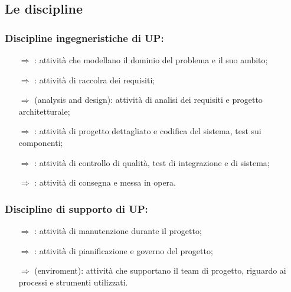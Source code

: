 \subsection{Le discipline}



\subsubsection{Discipline ingegneristiche di UP:}

\begin{itemize}
    \item [$\Rightarrow$] : attività che 
    modellano il dominio del problema e il suo ambito;
    \item [$\Rightarrow$] : attività di raccolra dei requisiti;
    \item [$\Rightarrow$]  (analysis and design): attività di analisi dei requisiti
    e progetto architetturale;
    \item [$\Rightarrow$] : attività di progetto dettagliato e codifica del sistema, test sui componenti;
    \item [$\Rightarrow$] : attività di controllo di qualità, test di integrazione e di sistema;
    \item [$\Rightarrow$] : attività di consegna e messa in opera.
\end{itemize}

\subsubsection{Discipline di supporto di UP:}

\begin{itemize}
    \item [$\Rightarrow$] : attività di manutenzione durante il progetto;
    \item [$\Rightarrow$] : attività di pianificazione e governo del progetto;
    \item [$\Rightarrow$]  (enviroment): attività che supportano il team di progetto, riguardo ai processi e strumenti utilizzati.
\end{itemize}

